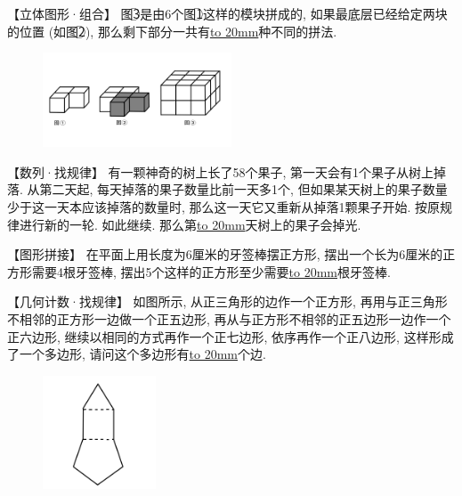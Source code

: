 \item {
    【立体图形·组合】
    图\textcircled{3}是由6个图\textcircled{1}这样的模块拼成的, 如果最底层已经给定两块的位置 (如图\textcircled{2}), 那么剩下部分一共有\underline{\hbox to 20mm{}}种不同的拼法.
    \begin{figure}[H] 
        \centering
        \includegraphics[width=0.5\textwidth]{./pics/Chapter_4/2016_2.png}
    \end{figure}
}

\item {
    【数列·找规律】
    有一颗神奇的树上长了58个果子, 第一天会有1个果子从树上掉落. 从第二天起, 每天掉落的果子数量比前一天多1个, 但如果某天树上的果子数量少于这一天本应该掉落的数量时, 那么这一天它又重新从掉落1颗果子开始. 按原规律进行新的一轮. 如此继续. 那么第\underline{\hbox to 20mm{}}天树上的果子会掉光.
    \vspace{1cm}
}

\item {
    【图形拼接】
    在平面上用长度为6厘米的牙签棒摆正方形, 摆出一个长为6厘米的正方形需要4根牙签棒, 摆出5个这样的正方形至少需要\underline{\hbox to 20mm{}}根牙签棒. 
    \vspace{1cm}
}

\item {
    【几何计数·找规律】
    如图所示, 从正三角形的边作一个正方形, 再用与正三角形不相邻的正方形一边做一个正五边形, 再从与正方形不相邻的正五边形一边作一个正六边形, 继续以相同的方式再作一个正七边形, 依序再作一个正八边形, 这样形成了一个多边形, 请问这个多边形有\underline{\hbox to 20mm{}}个边. 
    \begin{figure}[H] 
        \centering
        \includegraphics[width=0.3\textwidth]{./pics/Chapter_4/2015_3.png}
    \end{figure}
}

